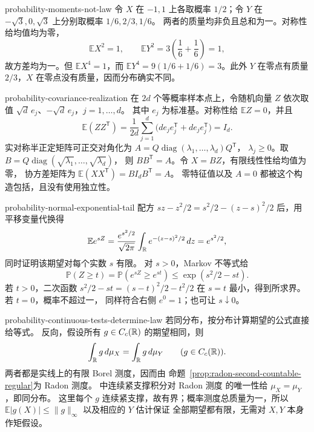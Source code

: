 \begin{solution}{probability-moments-not-law}
令 \(X\) 在 \(-1,1\) 上各取概率 \(1/2\)；令 \(Y\) 在
\(-\sqrt3,0,\sqrt3\) 上分别取概率 \(1/6,2/3,1/6\)。
两者的质量均非负且总和为一。对称性给均值均为零，
\[
 \mathbb E X^2=1,\qquad
 \mathbb E Y^2=3\left(\frac16+\frac16\right)=1,
\]
故方差均为一。但
\(\mathbb E X^4=1\)，而
\(\mathbb E Y^4=9(1/6+1/6)=3\)。此外 \(Y\) 在零点有质量
\(2/3\)，\(X\) 在零点没有质量，因而分布确实不同。
\end{solution}

\begin{solution}{probability-covariance-realization}
在 \(2d\) 个等概率样本点上，令随机向量 \(Z\) 依次取值
\(\sqrt d\,e_j\)、\(-\sqrt d\,e_j\)，\(j=1,\ldots,d\)。
其中 \(e_j\) 为标准基。对称性给 \(\mathbb E Z=0\)，并且
\[
 \mathbb E(ZZ^{\mathsf T})
 =\frac1{2d}\sum_{j=1}^d
       \bigl(de_je_j^{\mathsf T}+de_je_j^{\mathsf T}\bigr)=I_d.
\]
实对称半正定矩阵可正交对角化为
\(A=Q\operatorname{diag}(\lambda_1,\ldots,\lambda_d)Q^{\mathsf T}\)，
\(\lambda_j\ge0\)。取
\(B=Q\operatorname{diag}(\sqrt{\lambda_1},\ldots,\sqrt{\lambda_d})\)，
则 \(BB^{\mathsf T}=A\)。令 \(X=BZ\)，有限线性性给均值为零，
协方差矩阵为
\(\mathbb E(XX^{\mathsf T})=B I_d B^{\mathsf T}=A\)。
零特征值以及 \(A=0\) 都被这个构造包括，且没有使用独立性。
\end{solution}

\begin{solution}{probability-normal-exponential-tail}
配方 \(sz-z^2/2=s^2/2-(z-s)^2/2\) 后，用平移变量代换得
\[
 \mathbb E e^{sZ}
 =\frac{e^{s^2/2}}{\sqrt{2\pi}}
   \int_{\mathbb{R}} e^{-(z-s)^2/2}\,dz=e^{s^2/2},
\]
同时证明该期望对每个实数 \(s\) 有限。
对 \(s>0\)，Markov 不等式给
\[
 \mathbb P(Z\ge t)=\mathbb P(e^{sZ}\ge e^{st})
 \le\exp(s^2/2-st).
\]
若 \(t>0\)，二次函数 \(s^2/2-st=(s-t)^2/2-t^2/2\)
在 \(s=t\) 最小，得到所求界。若 \(t=0\)，概率不超过一，
同样符合右侧 \(e^0=1\)；也可让 \(s\downarrow0\)。
\end{solution}

\begin{solution}{probability-continuous-tests-determine-law}
若同分布，按分布计算期望的公式直接给等式。
反向，假设所有 \(g\in C_c(\mathbb{R})\) 的期望相同，则
\[
 \int_{\mathbb{R}} g\,d\mu_X=\int_{\mathbb{R}} g\,d\mu_Y
 \qquad(g\in C_c(\mathbb{R})).
\]
两者都是实线上的有限 Borel 测度，因而由
命题~\ref{prop:radon-second-countable-regular}为 Radon 测度。
中连续紧支撑积分对 Radon 测度
的唯一性给 \(\mu_X=\mu_Y\)，即同分布。
这里每个 \(g\) 连续紧支撑，故有界；概率测度总质量为一，所以
\(\mathbb E|g(X)|\le\|g\|_\infty\) 以及相应的 \(Y\) 估计保证
全部期望都有限，无需对 \(X,Y\) 本身作矩假设。
\end{solution}
